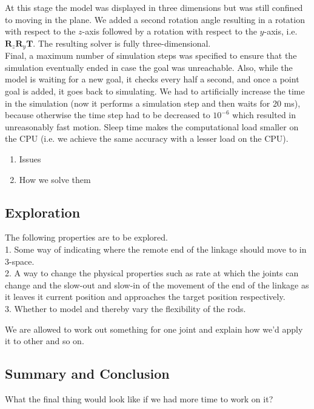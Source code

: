 \documentclass[paper=a4, fontsize=11pt]{scrartcl} %
\numberwithin{equation}{section} %
\numberwithin{figure}{section} %
\numberwithin{table}{section} %
\begin{document}
At this stage the model was displayed in three dimensions but was still confined to moving in the plane. We added a second rotation angle resulting in a rotation with respect to the \(z\)-axis followed by a rotation with respect to the \(y\)-axis, i.e. \( \mathbf{R}_z \mathbf{R}_y \mathbf{T}\). The resulting solver is fully three-dimensional. \\

Final, a maximum number of simulation steps was specified to ensure that the simulation eventually ended in case the goal was unreachable. Also, while the model is waiting for a new goal, it checks every half a second, and once a point goal is added, it goes back to simulating. We had to artificially increase the time in the simulation (now it performs a simulation step and then waits for 20 ms), because otherwise the time step had to be decreased to \(10^{-6}\) which resulted in unreasonably fast motion. Sleep time makes the computational load smaller on the CPU (i.e. we achieve the same accuracy with a lesser load on the CPU). 





    \begin{enumerate}
    \item Issues
    \item How we solve them
  \end{enumerate}
  
\subsection{Exploration}
The following properties are to be explored.\\
1. Some way of indicating where the remote end of the linkage should move to in 3-space.\\
2. A way to change the physical properties such as rate at which the joints can change and the slow-out and slow-in of the movement of the end of the linkage as it leaves it current position and approaches the target position respectively.\\
3. Whether to model and thereby vary the flexibility of the rods.


We are allowed to work out something for one joint and explain how we'd apply it to other and so on.

\subsection{Summary and Conclusion}
What the final thing would look like if we had more time to work on it?

\end{document}
